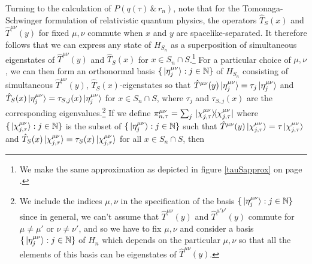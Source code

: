Turning to the calculation of $P(q(\tau)\, \& \, r_n)$, note that for the Tomonaga-Schwinger formulation of relativistic quantum physics, the operators $\hat{T}_S(x)$ and $\hat{T}^{\mu\nu}(y)$ for fixed $\mu,\nu$ commute when $x$ and $y$ are spacelike-separated. It therefore follows that we can express any state of $H_{S_n}$ as a superposition of simultaneous eigenstates of $\hat{T}^{\mu\nu}(y)$ and $\hat{T}_S(x)$ for $x\in S_n\cap S$.\footnote{We make the same approximation as depicted in figure \ref{tauSapprox} on page \pageref{tauSapprox}.}  For a particular choice of $\mu,\nu$, we can then form an orthonormal basis $\{\ket*{\eta_j^{\mu\nu}}:j\in\mathbb{N}\}$ of %
%
 $H_{S_n}$ consisting of simultaneous $\hat{T}^{\mu\nu}(y)$, $\hat{T}_S(x)$-eigenstates so that $\hat{T}^{\mu\nu}(y)\ket*{\eta_j^{\mu\nu}}=\tau_{j}\ket*{\eta_j^{\mu\nu}}$ and $\hat{T}_{S}(x)\ket*{\eta_j^{\mu\nu}}=\tau_{S,j}(x)\ket*{\eta_j^{\mu\nu}}$ for $x\in S_n\cap S$, where $\tau_{j}$ and $\tau_{S,j}(x)$ are the corresponding eigenvalues.\footnote{We include the indices   $\mu,\nu$ in the specification of the basis $\{\ket*{\eta_j^{\mu\nu}}:j\in\mathbb{N}\}$ since in general, we can't assume that $\hat{T}^{\mu\nu}(y)$ and $\hat{T}^{\mu'\nu'}(y)$ commute for $\mu\neq \mu'$ or $\nu\neq \nu'$, and so we have to fix $\mu,\nu$ and consider a basis $\{\ket*{\eta_j^{\mu\nu}}:j\in\mathbb{N}\}$ of $H_n$ which depends on the particular $\mu,\nu$ so that all the elements of this basis can be eigenstates of  $\hat{T}^{\mu\nu}(y)$.} If we define %
   $\pi_{n,\tau}^{\mu\nu}=\sum_j\dyad*{\chi_{j,\tau}^{\mu\nu}}$ where $\{\ket*{\chi_{j,\tau}^{\mu\nu}}:j\in\mathbb{N}\}$ %
  is the subset of $\{\ket*{\eta_j^{\mu\nu}}:j\in\mathbb{N}\}$ such that $\hat{T}^{\mu\nu}(y)\ket*{\chi_{j,\tau}^{\mu\nu}}=\tau\ket*{\chi_{j,\tau}^{\mu\nu}}$ and $\hat{T}_S(x)\ket*{\chi_{j,\tau}^{\mu\nu}}=\tau_S(x)\ket*{\chi_{j,\tau}^{\mu\nu}}$ for all $x\in S_n\cap S$, then 
